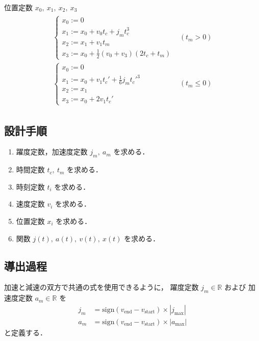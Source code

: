 \documentclass[a5paper]{ltjsarticle}
\begin{document}
位置定数 $x_0,~x_1,~x_2,~x_3$
\begin{align}
    \begin{array}{ll}
        \left\{ \begin{array}{l}
            x_0 := 0                         \\
            x_1 := x_0 + v_0 t_c + j_m t_c^3 \\
            x_2 := x_1 + v_1 t_m             \\
            x_3 := x_0 + \frac{1}{2} (v_0+v_3) (2t_c+t_m)
        \end{array} \right.
         &
        (t_m > 0)
        \\
        \left\{ \begin{array}{l}
            x_0 := 0                                       \\
            x_1 := x_0 + v_1 t_c' + \frac{1}{6} j_m t_c'^3 \\
            x_2 := x_1                                     \\
            x_3 := x_0 + 2 v_1 t_c'
        \end{array} \right.
         &
        (t_m \leq 0)
    \end{array}
\end{align}

\subsection{設計手順}
\begin{enumerate}
    \item 躍度定数，加速度定数 $j_m,~a_m$ を求める．
    \item 時間定数 $t_c,~t_m$ を求める．
    \item 時刻定数 $t_i$ を求める．
    \item 速度定数 $v_i$ を求める．
    \item 位置定数 $x_i$ を求める．
    \item 関数 $j(t),~ a(t),~ v(t),~ x(t)$ を求める．
\end{enumerate}

\subsection{導出過程}
加速と減速の双方で共通の式を使用できるように，
躍度定数 $j_m \in \mathbb{R}$ および 加速度定数 $a_m \in \mathbb{R}$ を
\begin{align}
    j_m & = \mathrm{sign}(v_\mathrm{end}-v_\mathrm{start}) \times|j_{\max}| \\
    a_m & = \mathrm{sign}(v_\mathrm{end}-v_\mathrm{start}) \times|a_{\max}|
\end{align}
と定義する．
\end{document}
